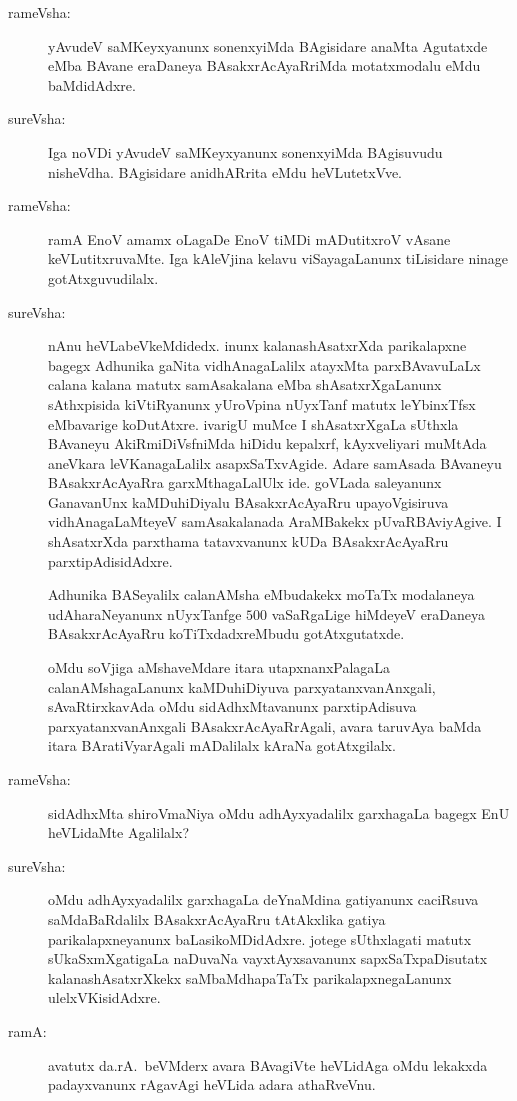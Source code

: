 \begin{description}
\item[rameVsha:] yAvudeV saMKeyxyanunx sonenxyiMda BAgisidare anaMta Agutatxde eMba BAvane eraDaneya BAsakxrAcAyaRriMda motatxmodalu eMdu baMdidAdxre.

\item[sureVsha:] Iga noVDi yAvudeV saMKeyxyanunx sonenxyiMda BAgisuvudu nisheVdha. BAgisidare anidhARrita eMdu heVLutetxVve.

\item[rameVsha:] ramA EnoV amamx oLagaDe EnoV tiMDi mADutitxroV vAsane keVLutitxruvaMte. Iga kAleVjina kelavu viSayagaLanunx tiLisidare ninage gotAtxguvudilalx.

\item[sureVsha:] nAnu heVLabeVkeMdidedx. inunx kalanashAsatxrXda parikalapxne bagegx Adhunika gaNita vidhAnagaLalilx atayxMta parxBAvavuLaLx calana kalana matutx samAsakalana eMba shAsatxrXgaLanunx sAthxpisida kiVtiRyanunx yUroVpina nUyxTanf matutx leYbinxTfsx eMbavarige koDutAtxre. ivarigU muMce I shAsatxrXgaLa sUthxla BAvaneyu AkiRmiDiVsfniMda hiDidu kepalxrf, kAyxveliyari muMtAda aneVkara leVKanagaLalilx asapxSaTxvAgide. Adare samAsada BAvaneyu BAsakxrAcAyaRra garxMthagaLalUlx ide. goVLada saleyanunx GanavanUnx kaMDuhiDiyalu BAsakxrAcAyaRru upayoVgisiruva vidhAnagaLaMteyeV samAsakalanada AraMBakekx pUvaRBAviyAgive. I shAsatxrXda parxthama tatavxvanunx kUDa BAsakxrAcAyaRru parxtipAdisidAdxre.

Adhunika BASeyalilx calanAMsha eMbudakekx moTaTx modalaneya udAharaNeyanunx nUyxTanfge $500$ vaSaRgaLige hiMdeyeV eraDaneya BAsakxrAcAyaRru koTiTxdadxreMbudu gotAtxgutatxde.

oMdu soVjiga aMshaveMdare itara utapxnanxPalagaLa calanAMshagaLanunx kaMDuhiDiyuva parxyatanxvanAnxgali, sAvaRtirxkavAda oMdu sidAdhxMtavanunx parxtipAdisuva parxyatanxvanAnxgali BAsakxrAcAyaRrAgali, avara taruvAya baMda itara BAratiVyarAgali mADalilalx kAraNa gotAtxgilalx.

\item[rameVsha:] sidAdhxMta shiroVmaNiya oMdu adhAyxyadalilx garxhagaLa bagegx EnU heVLidaMte Agalilalx?

\item[sureVsha:] oMdu adhAyxyadalilx garxhagaLa deYnaMdina gatiyanunx caciRsuva saMdaBaRdalilx BAsakxrAcAyaRru tAtAkxlika gatiya parikalapxneyanunx baLasikoMDidAdxre. jotege sUthxlagati matutx sUkaSxmXgatigaLa naDuvaNa vayxtAyxsavanunx sapxSaTxpaDisutatx kalanashAsatxrXkekx saMbaMdhapaTaTx parikalapxnegaLanunx ulelxVKisidAdxre.

\item[ramA:] avatutx da.rA.\ beVMderx avara BAvagiVte heVLidAga oMdu lekakxda padayxvanunx rAgavAgi heVLida adara athaRveVnu.


\end{description}
